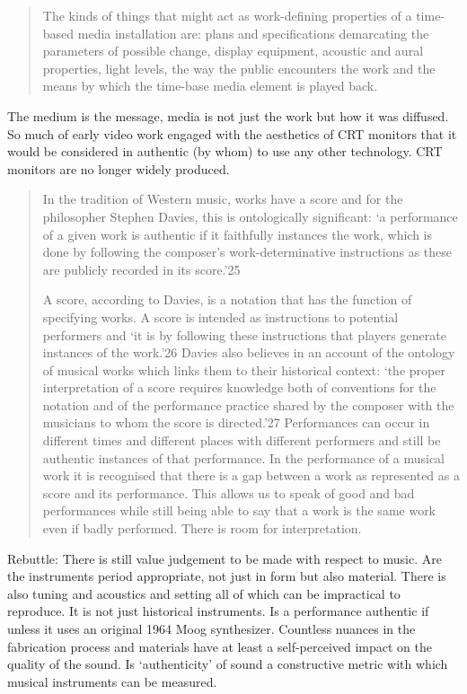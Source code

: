 \begin{quotation}
The kinds of things that might act as work-defining properties of a time-based
media installation are: plans and specifications demarcating the parameters of
possible change, display equipment, acoustic and aural properties, light levels,
the way the public encounters the work and the means by which the time-base
media element is played back.
\end{quotation}

The medium is the message, media is not just the work but how it was diffused.
So much of early video work engaged with the aesthetics of CRT monitors that it
would be considered in authentic (by whom) to use any other technology. CRT
monitors are no longer widely produced.

\begin{quotation}
In the tradition of Western music, works have a score and for the philosopher
Stephen Davies, this is ontologically significant: ‘a performance of a given
work is authentic if it faithfully instances the work, which is done by
following the composer’s work-determinative instructions as these are publicly
recorded in its score.’25

A score, according to Davies, is a notation that has the function of specifying
works. A score is intended as instructions to potential performers and ‘it is by
following these instructions that players generate instances of the work.’26
Davies also believes in an account of the ontology of musical works which links
them to their historical context: ‘the proper interpretation of a score requires
knowledge both of conventions for the notation and of the performance practice
shared by the composer with the musicians to whom the score is directed.’27
Performances can occur in different times and different places with different
performers and still be authentic instances of that performance. In the
performance of a musical work it is recognised that there is a gap between a
work as represented as a score and its performance. This allows us to speak of
good and bad performances while still being able to say that a work is the same
work even if badly performed. There is room for interpretation.
\end{quotation}

Rebuttle: There is still value judgement to be made with respect to music. Are
the instruments period appropriate, not just in form but also material. There is
also tuning and acoustics and setting all of which can be impractical to
reproduce. It is not just historical instruments. Is a performance authentic if
unless it uses an original 1964 Moog synthesizer. Countless nuances in the
fabrication process and materials have at least a self-perceived impact on the
quality of the sound. Is `authenticity' of sound a constructive metric with
which musical instruments can be measured.

